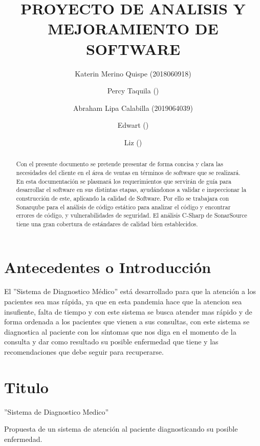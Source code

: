\documentclass[preprint,12pt]{elsarticle}
\begin{document}
	
	\begin{frontmatter}

		\title{\huge  PROYECTO DE  ANALISIS Y  MEJORAMIENTO DE  SOFTWARE }
		\author{Katerin Merino Quispe              (2018060918)}
		\author{Percy Taquila                ()}
		\author{Abraham Lipa Calabilla (2019064039)}
		\author{Edwart                ()}
		\author{Liz                ()}
		\address{Tacna, Perú}
		


\begin{abstract}
Con el presente documento se pretende presentar de forma concisa y clara las necesidades del cliente en el área de ventas en términos de software que se realizará. 
En esta documentación se plasmará los requerimientos que servirán de guía para desarrollar el software en sus distintas etapas, ayudándonos a validar e inspeccionar la construcción de este, aplicando la calidad de Software.
Por ello se trabajara con  Sonarqube para el análisis de código estático
para analizar el código y encontrar errores de código, y vulnerabilidades de seguridad. 
El análisis C-Sharp de SonarSource tiene una gran cobertura de estándares de calidad bien establecidos.  
\end{abstract}


\end{frontmatter}
\section{Antecedentes o Introducción}

El ''Sistema de Diagnostico Médico'' está desarrollado para que la atención a los pacientes sea mas rápida, ya que en esta pandemia hace que la atencion sea insufiente, falta de tiempo y con este sistema se busca atender mas rápido y de forma ordenada a los pacientes que vienen a sus consultas, con este sistema se diagnostica al paciente con los síntomas que nos diga en el momento de la consulta y dar como resultado su posible enfermedad que tiene y las recomendaciones que debe seguir para recuperarse.

\section{Titulo}
''Sistema de Diagnostico Medico''

Propuesta de un sistema de atención al paciente diagnosticando su posible enfermedad.
\end{document}
